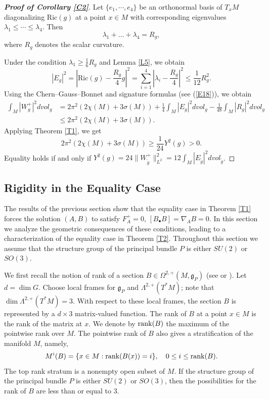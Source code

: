 \documentclass[12pt, twoside]{article}
\theoremstyle{definition}
\numberwithin{equation}{section}
\def \la {\lambda}
\def \La {\Lambda}
\def\Om{\Omega}
\def\na {\nabla}
\begin{document}
\begin{proof}[\textbf{Proof of Corollary \ref{C2}}]
Let $\{e_{1},\cdots,e_{4}\}$ be an orthonormal basis of $T_{x}M$ diagonalizing $\mathrm{Ric}(g)$ at a point $x\in M$
 with corresponding eigenvalues $\la_{1}\leq\cdots\leq\la_{4}$. Then 
$$\la_{1}+\dots+\la_{4}=R_{g},$$ 
where $R_{g}$ denotes the scalar curvature.	
	
Under the condition $\la_{1}\geq\frac{1}{6}R_{g}$ and Lemma \ref{L5}, we obtain
\[|E_{g}|^{2}=|\mathrm{Ric}(g)-\frac{R_{g}}{4}g|^{2}=\sum_{i=1}^{4}|\la_{i}-\frac{R_{g}}{4}|^{2}\leq \frac{1}{12}R^{2}_{g}.\]
Using the Chern--Gauss--Bonnet and signature formulas (see (\ref{E18})), we obtain
\begin{equation*}
\begin{split}
\int_{M}|W^{+}_{g}|^{2}dvol_{g}&=2\pi^{2}(2\chi(M)+3\sigma(M))+\frac{1}{4}\int_{M}|E_{g}|^{2}dvol_{g}-\frac{1}{48}\int_{M}|R_{g}|^{2}dvol_{g}\\
&\leq 2\pi^{2}(2\chi(M)+3\sigma(M)).
\end{split}
\end{equation*}
Applying Theorem \ref{T1}, we get
\begin{equation*}
2\pi^{2}(2\chi(M)+3\sigma(M))\geq\frac{1}{24}Y^{2}(g)>0.
\end{equation*}
Equality holds if and only if \(Y^{2}(g)=24\|W^{+}_{\tilde{g}}\|^{2}_{L^{2}}=12\int_{M}|E_{\tilde{g}}|^{2}dvol_{\tilde{g}}\).
\end{proof}




\subsection{Rigidity in the Equality Case}
The results of the previous section show that the equality case in Theorem \ref{T1} forces the solution $(A,B)$ to satisfy $F_{A}^{+}=0$, $[B_{\bullet}B]=\na_{A}B=0$. In this section we analyze the geometric consequences of these conditions, leading to a characterization of the equality case in Theorem \ref{T2}. Throughout this section we assume that the structure group of the principal bundle $P$ is either $SU(2)$ or $SO(3)$.

We first recall the notion of rank of a section $B\in\Om^{2,+}(M,\mathfrak{g}_{P})$ (see \cite{DG22} or \cite[Definiton 1.5]{Tan17}). Let $d=\dim G$. Choose local frames for $\mathfrak{g}_{P}$ and $\La^{2,+}(T^{\ast}M)$; note that $\dim\La^{2,+}(T^{\ast}M)=3$. With respect to these local frames, the section $B$ is represented by a $d\times 3$ matrix-valued function. The rank of $B$ at a point $x\in M$ is the rank of the matrix at $x$. We denote by ${\rm{rank}}(B)$ the maximum of the pointwise rank over $M$. The pointwise rank of $B$ also gives a stratification of the manifold $M$, namely,
\begin{equation}
M^{i}(B) =\{x\in M:{\rm{rank}}(B(x))=i\},\quad 0\leq i\leq {\rm{rank}}(B).
\end{equation}
The top rank stratum is a nonempty open subset of $M$.  If the structure group of the principal bundle $P$ is either $SU(2)$ or $SO(3)$, then the possibilities for the rank of $B$ are less than or equal to $3$. 
\end{document}
